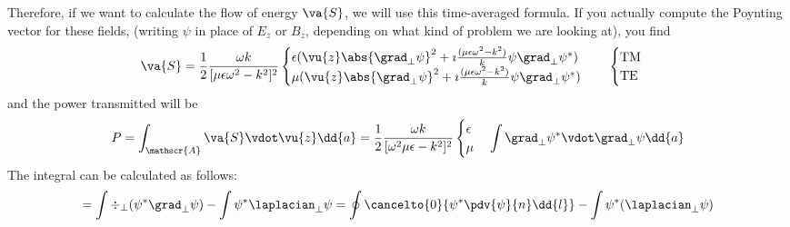 \documentclass[a4paper,twoside,master.tex]{subfiles}
\begin{document}
Therefore, if we want to calculate the flow of energy $ \va{S} $, we will use this time-averaged formula. If you actually compute the Poynting vector for these fields, (writing $ \psi $ in place of $ E_z $ or $ B_z $, depending on what kind of problem we are looking at), you find
\begin{equation}
    \va{S} =\frac{1}{2} \frac{\omega k}{[\mu \epsilon \omega^2 - k^2]^2} \begin{cases} \epsilon (\vu{z} \abs{\grad_{\perp}{\psi}}^2 + \imath \frac{(\mu \epsilon \omega^2 - k^2)}{k} \psi \grad_{\perp}{\psi^*}) \\ \mu (\vu{z} \abs{\grad_{\perp}{\psi}}^2 + \imath \frac{(\mu \epsilon \omega^2 - k^2)}{k} \psi \grad_{\perp}{\psi^*})  \end{cases} \quad \begin{cases} \text{TM} \\ \text{TE} \end{cases}
\end{equation}
and the power transmitted will be
\begin{equation}
    P = \int_{\mathscr{A}} \va{S} \vdot \vu{z} \dd{a} = \frac{1}{2} \frac{\omega k}{[\omega^2 \mu \epsilon - k^2]^2} \begin{cases} \epsilon \\ \mu \end{cases} \int \grad_{\perp}{\psi^*} \vdot \grad_{\perp}{\psi} \dd{a}
\end{equation}
The integral can be calculated as follows:
\begin{equation}
    = \int \div_{\perp} (\psi^* \grad_{\perp}{\psi}) - \int \psi^* \laplacian_{\perp}{\psi} = \oint \cancelto{0}{\psi^* \pdv{\psi}{n} \dd{l}} - \int \psi^* (\laplacian_{\perp}{\psi})
\end{equation}
\end{document}
